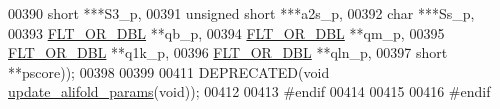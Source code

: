 \begin{DoxyCode}
00390                      \textcolor{keywordtype}{short} ***S3\_p,
00391                      \textcolor{keywordtype}{unsigned} \textcolor{keywordtype}{short} ***a2s\_p,
00392                      \textcolor{keywordtype}{char} ***Ss\_p,
00393                      \hyperlink{group__data__structures_ga31125aeace516926bf7f251f759b6126}{FLT\_OR\_DBL} **qb\_p,
00394                      \hyperlink{group__data__structures_ga31125aeace516926bf7f251f759b6126}{FLT\_OR\_DBL} **qm\_p,
00395                      \hyperlink{group__data__structures_ga31125aeace516926bf7f251f759b6126}{FLT\_OR\_DBL} **q1k\_p,
00396                      \hyperlink{group__data__structures_ga31125aeace516926bf7f251f759b6126}{FLT\_OR\_DBL} **qln\_p,
00397                      \textcolor{keywordtype}{short} **pscore));
00398 
00399 
00411 DEPRECATED(\textcolor{keywordtype}{void} \hyperlink{group__consensus__fold_gac484c6bd429bafbd353b91044508d8e9}{update\_alifold\_params}(\textcolor{keywordtype}{void}));
00412 
00413 \textcolor{preprocessor}{#endif}
00414 
00415 
00416 \textcolor{preprocessor}{#endif}
\end{DoxyCode}
